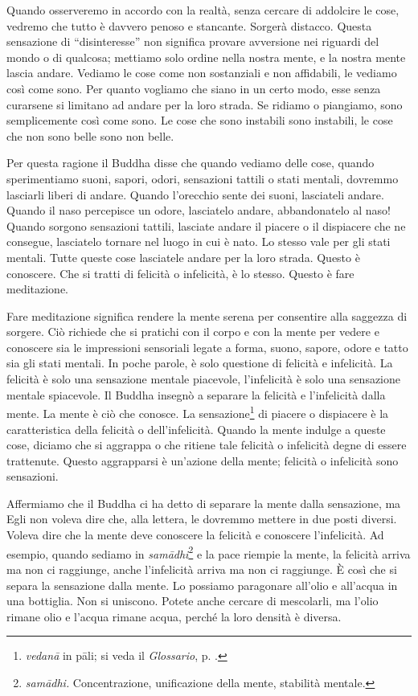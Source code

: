 Quando osserveremo in accordo con la realtà, senza cercare di addolcire
le cose, vedremo che tutto è davvero penoso e stancante. Sorgerà
distacco. Questa sensazione di ``disinteresse'' non significa provare
avversione nei riguardi del mondo o di qualcosa; mettiamo solo ordine
nella nostra mente, e la nostra mente lascia andare. Vediamo le cose
come non sostanziali e non affidabili, le vediamo così come sono. Per
quanto vogliamo che siano in un certo modo, esse senza curarsene si
limitano ad andare per la loro strada. Se ridiamo o piangiamo, sono
semplicemente così come sono. Le cose che sono instabili sono instabili,
le cose che non sono belle sono non belle.

Per questa ragione il Buddha disse che quando vediamo delle cose, quando
sperimentiamo suoni, sapori, odori, sensazioni tattili o stati mentali,
dovremmo lasciarli liberi di andare. Quando l'orecchio sente dei suoni,
lasciateli andare. Quando il naso percepisce un odore, lasciatelo
andare, abbandonatelo al naso! Quando sorgono sensazioni tattili,
lasciate andare il piacere o il dispiacere che ne consegue, lasciatelo
tornare nel luogo in cui è nato. Lo stesso vale per gli stati mentali.
Tutte queste cose lasciatele andare per la loro strada. Questo è
conoscere. Che si tratti di felicità o infelicità, è lo stesso. Questo è
fare meditazione.

Fare meditazione significa rendere la mente serena per consentire alla
saggezza di sorgere. Ciò richiede che si pratichi con il corpo e con la
mente per vedere e conoscere sia le impressioni sensoriali legate a
forma, suono, sapore, odore e tatto sia gli stati mentali. In poche
parole, è solo questione di felicità e infelicità. La felicità è solo
una sensazione mentale piacevole, l'infelicità è solo una sensazione
mentale spiacevole. Il Buddha insegnò a separare la felicità e
l'infelicità dalla mente. La mente è ciò che conosce. La
sensazione\footnote{\emph{vedanā} in pāli; si veda il \emph{Glossario}, p. \pageref{glossary-vedana}.}
di piacere o dispiacere è la caratteristica della felicità o
dell'infelicità. Quando la mente indulge a queste cose, diciamo che si
aggrappa o che ritiene tale felicità o infelicità degne di essere
trattenute. Questo aggrapparsi è un'azione della mente; felicità o
infelicità sono sensazioni.

Affermiamo che il Buddha ci ha detto di separare la mente dalla
sensazione, ma Egli non voleva dire che, alla lettera, le dovremmo
mettere in due posti diversi. Voleva dire che la mente deve conoscere la
felicità e conoscere l'infelicità. Ad esempio, quando sediamo in
\emph{samādhi}\footnote{\emph{samādhi.} Concentrazione, unificazione
  della mente, stabilità mentale.} e la pace riempie la mente, la
felicità arriva ma non ci raggiunge, anche l'infelicità arriva ma non ci
raggiunge. È così che si separa la sensazione dalla mente. Lo possiamo
paragonare all'olio e all'acqua in una bottiglia. Non si uniscono.
Potete anche cercare di mescolarli, ma l'olio rimane olio e l'acqua
rimane acqua, perché la loro densità è diversa.

